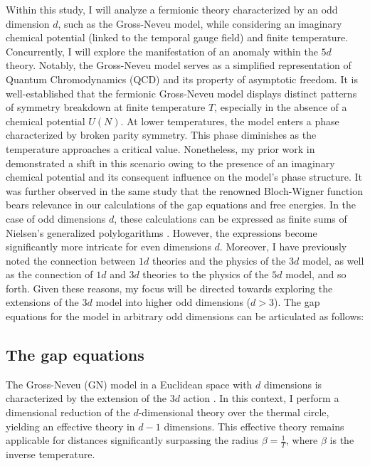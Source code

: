 \documentclass[twoside]{article}
\begin{document}
Within this study, I will analyze a fermionic theory characterized by an odd dimension $d$, such as the Gross-Neveu model, while considering an imaginary chemical potential (linked to the temporal gauge field) and finite temperature. Concurrently, I will explore the manifestation of an anomaly within the $5d$ theory. Notably, the Gross-Neveu model serves as a simplified representation of Quantum Chromodynamics (QCD) and its property of asymptotic freedom. It is well-established that the fermionic Gross-Neveu model displays distinct patterns of symmetry breakdown at finite temperature $T$, especially in the absence of a chemical potential $U(N)$. At lower temperatures, the model enters a phase characterized by broken parity symmetry. This phase diminishes as the temperature approaches a critical value.
Nonetheless, my prior work in \cite{Filothodoros:2016txa} demonstrated a shift in this scenario owing to the presence of an imaginary chemical potential and its consequent influence on the model's phase structure. It was further observed in the same study that the renowned Bloch-Wigner function \cite{Zagier1} bears relevance in our calculations of the gap equations and free energies. In the case of odd dimensions $d$, these calculations can be expressed as finite sums of Nielsen's generalized polylogarithms \cite{Filothodoros:2016txa, Borwein, Kolbig}. However, the expressions become significantly more intricate for even dimensions $d$. Moreover, I have previously noted the connection between $1d$ theories and the physics of the $3d$ model, as well as the connection of $1d$ and $3d$ theories to the physics of the $5d$ model, and so forth. Given these reasons, my focus will be directed towards exploring the extensions of the $3d$ model into higher odd dimensions ($d>3$). The gap equations for the model in arbitrary odd dimensions can be articulated as follows:

\subsection{The gap equations}
The Gross-Neveu (GN) model in a Euclidean space with $d$ dimensions is characterized by the extension of the $3d$ action \cite{Filothodoros:2018, Thesis Filothodoros, Petkou:1998wd, Christiansen:1999uv}. In this context, I perform a dimensional reduction of the $d$-dimensional theory over the thermal circle, yielding an effective theory in $d-1$ dimensions. This effective theory remains applicable for distances significantly surpassing the radius $\beta=\frac{1}{T}$, where $\beta$ is the inverse temperature.
\end{document}
